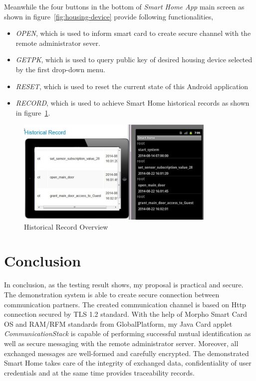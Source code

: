 Meanwhile the four buttons in the bottom of  \emph{Smart Home App} main screen as shown in figure~\ref{fig:housing-device} provide following functionalities,
\begin{itemize}
\item \emph{OPEN}, which is used to inform smart card to create secure channel with the remote administrator sever.
\item \emph{GETPK}, which is used to query public key of desired housing device selected  by the first drop-down menu.
\item \emph{RESET}, which is used to reset the current state of this Android application
\item \emph{RECORD}, which is used to achieve Smart Home historical records as shown in figure~\ref{fig:record-query}.

\end{itemize}

\begin{figure}[!htb]
	\centering
	\includegraphics[width=0.85\textwidth]{Images/impl/record-query.jpg}
		\caption{Historical Record Overview}
	\label{fig:record-query}
\end{figure}

\section{Conclusion}
In conclusion, as the testing result shows, my proposal is practical and secure. The demonstration system is able to create secure connection between communication partners. The created communication channel is based on Http connection secured by TLS 1.2 standard. With the help of Morpho Smart Card OS and RAM/RFM standards from GlobalPlatform, my Java Card applet \emph{CommunicationStack} is capable of performing successful mutual identification as well as secure messaging with the remote administrator server. Moreover, all exchanged messages are well-formed and carefully encrypted. The demonstrated Smart Home takes care of the integrity of exchanged data, confidentiality of user credentials and at the same time provides traceability records.